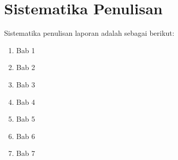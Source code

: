 \section{Sistematika Penulisan}
Sistematika penulisan laporan adalah sebagai berikut:
\begin{enumerate}
	\item Bab 1 \babSatu \\
	\item Bab 2 \babDua \\
	\item Bab 3 \babTiga \\
	\item Bab 4 \babEmpat \\
	\item Bab 5 \babLima \\
	\item Bab 6 \babEnam \\
	\item Bab 7 \babTujuh \\
\end{enumerate}

